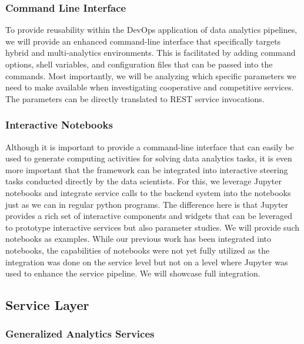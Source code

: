 \subsubsection{Command Line Interface}

To provide reusability within the DevOps application of data analytics
pipelines, we will provide an enhanced command-line interface that
specifically targets hybrid and multi-analytics environments. This is
facilitated by adding command options, shell variables, and
configuration files that can be passed into the commands.
Most importantly, we will be analyzing which specific parameters we
need to make available when investigating cooperative and competitive
services. The parameters can be directly translated to REST service invocations.

\subsubsection{Interactive Notebooks}

Although it is important to provide a command-line interface that can
easily be used to generate computing activities for solving data
analytics tasks, it is even more important that the framework can be
integrated into interactive steering tasks conducted directly by the
data scientists. For this, we leverage Jupyter notebooks and integrate
service calls to the backend system into the notebooks just as we can
in regular python programs. The difference here is that Jupyter
provides a rich set of interactive components and widgets that can be
leveraged to prototype interactive services but also parameter
studies. We will provide such notebooks as examples. While our
previous work has been integrated into notebooks, the capabilities of
notebooks were not yet fully utilized as the integration was done on
the service level but not on a level where Jupyter was used to enhance
the service pipeline. We will showcase full integration.

\subsection {Service Layer}

\subsubsection{Generalized Analytics Services}
\label{s:gas}

